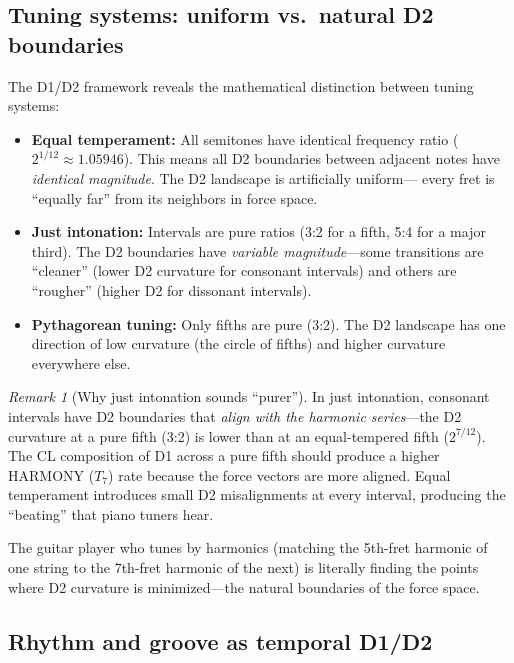 \documentclass[11pt]{article}
\theoremstyle{definition}
\theoremstyle{remark}
\newtheorem{remark}[theorem]{Remark}
\begin{document}
\subsection{Tuning systems: uniform vs.\ natural D2 boundaries}

The D1/D2 framework reveals the mathematical distinction between tuning systems:

\begin{itemize}[nosep]
  \item \textbf{Equal temperament:} All semitones have identical frequency ratio
    ($2^{1/12} \approx 1.05946$).  This means all D2 boundaries between adjacent
    notes have \emph{identical magnitude}.  The D2 landscape is artificially uniform---
    every fret is ``equally far'' from its neighbors in force space.
  \item \textbf{Just intonation:} Intervals are pure ratios (3:2 for a fifth, 5:4
    for a major third).  The D2 boundaries have \emph{variable magnitude}---some
    transitions are ``cleaner'' (lower D2 curvature for consonant intervals) and
    others are ``rougher'' (higher D2 for dissonant intervals).
  \item \textbf{Pythagorean tuning:} Only fifths are pure (3:2).  The D2 landscape
    has one direction of low curvature (the circle of fifths) and higher curvature
    everywhere else.
\end{itemize}

\begin{remark}[Why just intonation sounds ``purer'']
In just intonation, consonant intervals have D2 boundaries that \emph{align with the
harmonic series}---the D2 curvature at a pure fifth (3:2) is lower than at an
equal-tempered fifth ($2^{7/12}$).  The CL composition of D1 across a pure fifth
should produce a higher HARMONY ($T_7$) rate because the force vectors are more
aligned.  Equal temperament introduces small D2 misalignments at every interval,
producing the ``beating'' that piano tuners hear.

The guitar player who tunes by harmonics (matching the 5th-fret harmonic of one
string to the 7th-fret harmonic of the next) is literally finding the points where
D2 curvature is minimized---the natural boundaries of the force space.
\end{remark}

\subsection{Rhythm and groove as temporal D1/D2}
\end{document}
